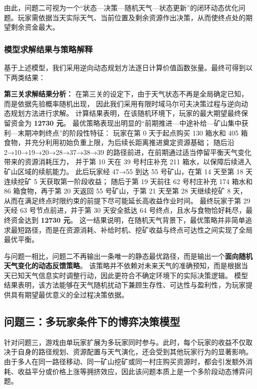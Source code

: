 \documentclass[UTF8,a4paper,12pt]{ctexart}
\begin{document}
由此，问题二可视为一个“状态—决策—随机天气—状态更新”的闭环动态优化问题。玩家需依据当天实际天气、当前位置及剩余资源作出决策，从而使终点处的期望剩余资金最大。

\subsubsection{模型求解结果与策略解释}

基于上述模型，我们采用逆向动态规划方法逐日计算价值函数张量。最终可得到以下两类结果：

\textbf{第三关求解结果分析：} 在第三关的设定下，由于天气状态不再是全局确定已知，而是依据先验概率随机出现，
因此我们采用有限时域马尔可夫决策过程与逆向动态规划方法进行求解。
计算结果表明，在该随机环境下，玩家的最大期望最终保留资金为 \textbf{12730 元}。
最优策略表现出明显的“前期推进—中途补给—矿山集中获利—末期冲刺终点”的阶段性特征：
玩家在第 0 天于起点购买 130 箱水和 405 箱食物，并充分利用初始负重上限，为后续长距离推进奠定资源基础；
随后沿 2→10→19→20→28→37→38→39 的路径前进，在前期通过适当停留平衡天气变化带来的资源消耗压力，
并于第 10 天在 39 号村庄补充 211 箱水，以保障后续进入矿山区域的续航能力。
此后玩家经 47→55 到达 55 号矿山，在第 14 天至第 18 天连续挖矿 5 天获取第一阶段收益；
随后于第 19 天前往 62 号村庄补充 174 箱水和 86 箱食物，再于第 20 天返回 55 号矿山，于第 21 天至第 28 天继续挖矿 8 天，
从而在满足终点时限约束的前提下尽可能延长高收益作业时间。
最终玩家于第 29 天经 63 号节点前进，并于第 30 天安全抵达 64 号终点，且水与食物恰好耗尽，最终资金达到 \textbf{12730 元}。
这一结果说明，在随机天气背景下，最优策略并非简单追求最短路径，而是在资源消耗、补给时机、挖矿收益与终点可达性之间实现了全局最优平衡。


与问题一相比，问题二不再输出一条唯一的静态最优路径，而是输出一个\textbf{面向随机天气变化的动态反馈策略}。
该策略并不依赖对未来天气的准确预知，而是根据当天已知天气信息实时调整行动，因此更符合不确定环境下的实际决策逻辑。
模型结果表明，该方法能够在天气随机扰动下兼顾生存性、可达性与盈利性，为玩家提供具有期望最优意义的全过程决策依据。

\subsection{问题三：多玩家条件下的博弈决策模型}

针对问题三，游戏由单玩家扩展为多玩家同时参与。此时，每个玩家的收益不仅取决于自身的路径规划、资源配置与天气演化，还会受到其他玩家行为的显著影响。
由于多人在同一路径移动、同一矿山挖矿或同一村庄购买资源时，都会引发额外消耗、收益平分或价格上涨等拥挤效应，因此该问题本质上是一个多阶段动态博弈问题。
\end{document}
